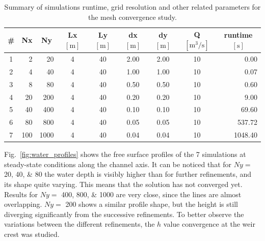 \begin{table}[h]
  \centering
  \caption{Summary of simulations runtime, grid resolution and other related parameters for the mesh convergence study.}
  \label{tab:mesh_study}
  \begin{tabular}{crrcccccr}
    \toprule
    \# & \multicolumn{1}{c}{Nx} & \multicolumn{1}{c}{Ny} & \multicolumn{1}{c}{Lx $[\si{\m}]$} & \multicolumn{1}{c}{Ly $[\si{\m}]$} & \multicolumn{1}{c}{dx $[\si{\m}]$} & \multicolumn{1}{c}{dy $[\si{\m}]$} & \multicolumn{1}{c}{Q $[\si{\cubic\m\per\s}]$} & \multicolumn{1}{c}{runtime $[\si{\s}]$} \\
    \midrule
    1  & 2             & 20            & 4               & 40          & 2.00        & 2.00        & 10                      & 0.00 \\
    2  & 4             & 40            & 4               & 40          & 1.00        & 1.00        & 10                      & 0.07 \\
    3  & 8             & 80            & 4               & 40          & 0.50        & 0.50        & 10                      & 0.60 \\
    4  & 20            & 200           & 4               & 40          & 0.20        & 0.20        & 10                      & 9.00 \\
    5  & 40            & 400           & 4               & 40          & 0.10        & 0.10        & 10                      & 69.60 \\
    6  & 80            & 800           & 4               & 40          & 0.05        & 0.05        & 10                      & 537.72 \\
    7  & 100           & 1000          & 4               & 40          & 0.04        & 0.04        & 10                      & 1048.40 \\
    \bottomrule
  \end{tabular}
\end{table}

Fig.~\ref{fig:water_profiles} shows the free surface profiles of the \num{7} simulations at steady-state conditions along the channel axis.
It can be noticed that for $Ny =$ \numlist{20;40;80} the water depth is visibly higher than for further refinements, and its shape quite varying.
This means that the solution has not converged yet.
Results for $Ny =$ \numlist{400;800;1000} are very close, since the lines are almost overlapping.
$Ny =$ \num{200} shows a similar profile shape, but the height is still diverging significantly from the successive refinements.
To better observe the variations between the different refinements, the $h$ value convergence at the weir crest was studied.

